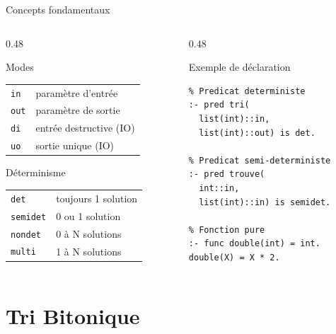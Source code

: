 \documentclass[aspectratio=169,12pt]{beamer}
\newcommand{\code}[1]{\texttt{\color{KeywordColor}#1}}
\begin{document}
\begin{frame}{\faCogs\quad Concepts fondamentaux}
  \begin{columns}[T]
    \begin{column}{0.48\textwidth}
      \begin{block}{\faCheckCircle\quad Modes}
        \begin{tabular}{ll}
          \code{in}  & paramètre d'entrée \\
          \code{out} & paramètre de sortie \\
          \code{di}  & entrée destructive (IO) \\
          \code{uo}  & sortie unique (IO) \\
        \end{tabular}
      \end{block}
      \vspace{0.4em}
      \begin{block}{\faListOl\quad Déterminisme}
        \begin{tabular}{ll}
          \code{det}    & toujours 1 solution \\
          \code{semidet}& 0 ou 1 solution \\
          \code{nondet} & 0 à N solutions \\
          \code{multi}  & 1 à N solutions \\
        \end{tabular}
      \end{block}
    \end{column}
    \begin{column}{0.48\textwidth}
      \begin{exampleblock}{\faCode\quad Exemple de déclaration}
\begin{lstlisting}
% Predicat deterministe
:- pred tri(
  list(int)::in,
  list(int)::out) is det.

% Predicat semi-deterministe
:- pred trouve(
  int::in,
  list(int)::in) is semidet.

% Fonction pure
:- func double(int) = int.
double(X) = X * 2.
\end{lstlisting}
      \end{exampleblock}
    \end{column}
  \end{columns}
\end{frame}

\section{Tri Bitonique}
\end{document}
